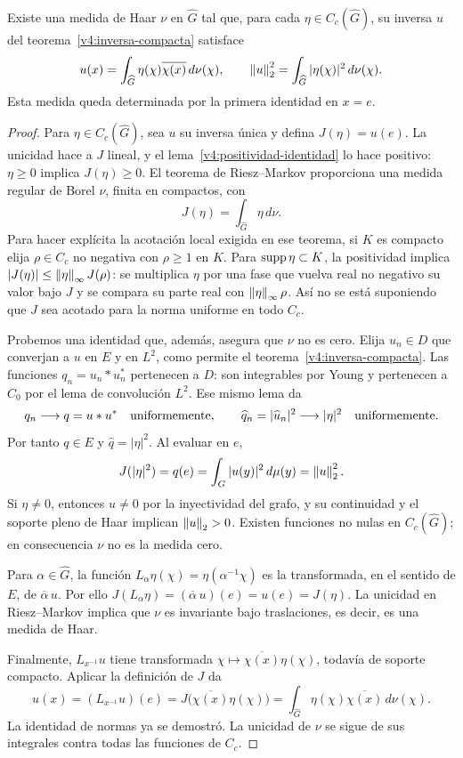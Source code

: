 \begin{teorema}\label{v4:haar-dual}
Existe una medida de Haar $\nu$ en $\widehat G$ tal que, para cada $\eta\in C_c(\widehat G)$, su inversa $u$ del teorema~\ref{v4:inversa-compacta} satisface
\[
 u(x)=\int_{\widehat G}\eta(\chi)\overline{\chi(x)}\,d\nu(\chi),
 \qquad
 \left\lVert u\right\rVert_2^2=\int_{\widehat G}|\eta(\chi)|^2\,d\nu(\chi).
\]
Esta medida queda determinada por la primera identidad en $x=e$.
\end{teorema}
\begin{proof}
Para $\eta\in C_c(\widehat G)$, sea $u$ su inversa única y defina $J(\eta)=u(e)$. La unicidad hace a $J$ lineal, y el lema~\ref{v4:positividad-identidad} lo hace positivo: $\eta\ge0$ implica $J(\eta)\ge0$. El teorema de Riesz--Markov proporciona una medida regular de Borel $\nu$, finita en compactos, con
\[
 J(\eta)=\int_{\widehat G}\eta\,d\nu.
\]
Para hacer explícita la acotación local exigida en ese teorema, si $K$ es compacto elija $\rho\in C_c$ no negativa con $\rho\ge1$ en $K$. Para $\operatorname{supp}\eta\subset K$, la positividad implica
$|J(\eta)|\le\left\lVert\eta\right\rVert_\infty J(\rho)$: se multiplica $\eta$ por una fase que vuelva real no negativo su valor bajo $J$ y se compara su parte real con $\left\lVert\eta\right\rVert_\infty\rho$. Así no se está suponiendo que $J$ sea acotado para la norma uniforme en todo $C_c$.

Probemos una identidad que, además, asegura que $\nu$ no es cero. Elija $u_n\in D$ que converjan a $u$ en $E$ y en $L^2$, como permite el teorema~\ref{v4:inversa-compacta}. Las funciones
$q_n=u_n*u_n^*$ pertenecen a $D$: son integrables por Young y pertenecen a $C_0$ por el lema de convolución $L^2$. Ese mismo lema da
\[
 q_n\longrightarrow q=u*u^*\quad\hbox{uniformemente},
 \qquad
 \widehat q_n=|\widehat u_n|^2\longrightarrow|\eta|^2
 \quad\hbox{uniformemente}.
\]
Por tanto $q\in E$ y $\widehat q=|\eta|^2$. Al evaluar en $e$,
\[
 J(|\eta|^2)=q(e)=\int_G|u(y)|^2\,d\mu(y)=\left\lVert u\right\rVert_2^2.
\]
Si $\eta\ne0$, entonces $u\ne0$ por la inyectividad del grafo, y su continuidad y el soporte pleno de Haar implican $\left\lVert u\right\rVert_2>0$. Existen funciones no nulas en $C_c(\widehat G)$; en consecuencia $\nu$ no es la medida cero.

Para $\alpha\in\widehat G$, la función $L_\alpha\eta(\chi)=\eta(\alpha^{-1}\chi)$ es la transformada, en el sentido de $E$, de $\overline\alpha\,u$. Por ello
$J(L_\alpha\eta)=(\overline\alpha\,u)(e)=u(e)=J(\eta)$.
La unicidad en Riesz--Markov implica que $\nu$ es invariante bajo traslaciones, es decir, es una medida de Haar.

Finalmente, $L_{x^{-1}}u$ tiene transformada $\chi\mapsto\overline{\chi(x)}\eta(\chi)$, todavía de soporte compacto. Aplicar la definición de $J$ da
\[
 u(x)=(L_{x^{-1}}u)(e)
 =J\bigl(\overline{\chi(x)}\eta(\chi)\bigr)
 =\int_{\widehat G}\eta(\chi)\overline{\chi(x)}\,d\nu(\chi).
\]
La identidad de normas ya se demostró. La unicidad de $\nu$ se sigue de sus integrales contra todas las funciones de $C_c$.
\end{proof}


